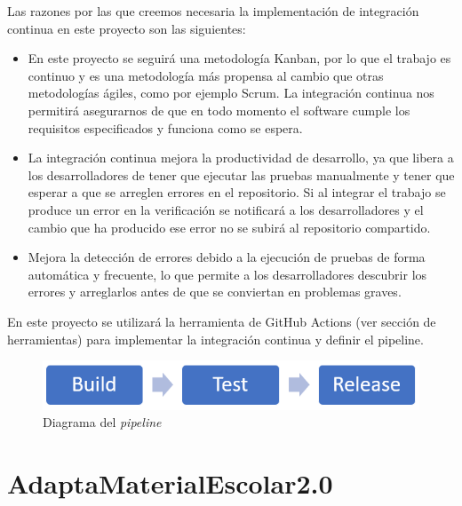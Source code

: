 Las razones por las que creemos necesaria la implementación de integración continua en este proyecto son las siguientes:
\begin{itemize}
    \item En este proyecto se seguirá una metodología Kanban, por lo que el trabajo es continuo y es una metodología más propensa al cambio que otras metodologías ágiles, como por ejemplo Scrum. La integración continua nos permitirá asegurarnos de que en todo momento el software cumple los requisitos especificados y funciona como se espera.
    \item La integración continua mejora la productividad de desarrollo, ya que libera a los desarrolladores de tener que ejecutar las pruebas manualmente y tener que esperar a que se arreglen errores en el repositorio. Si al integrar el trabajo se produce un error en la verificación se notificará a los desarrolladores y el cambio que ha producido ese error no se subirá al repositorio compartido.
    \item Mejora la detección de errores debido a la ejecución de pruebas de forma automática y frecuente, lo que permite a los desarrolladores descubrir los errores y arreglarlos antes de que se conviertan en problemas graves.
\end{itemize}

En este proyecto se utilizará la herramienta de GitHub Actions (ver sección de herramientas) para implementar la integración continua y definir el pipeline.

\begin{figure}[ht!]
    \centering
    \includegraphics[scale=0.7]{../Imagenes/DiagramaPipeline.png}
    \caption{Diagrama del \textit{pipeline}}
    \label{d1_pipeline}
\end{figure}

\section{AdaptaMaterialEscolar2.0}
